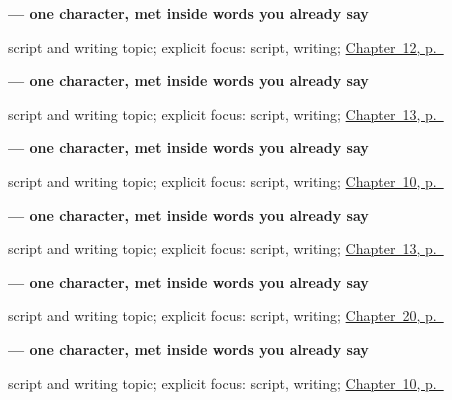 \noindent\begin{minipage}[t]{\linewidth}
\raggedright
\textbf{ — one character, met inside words you already say}\par
\footnotesize script and writing topic; explicit focus: script, writing; \hyperref[ch:ml-family]{Chapter~12, p.~\pageref*{ch:ml-family}}
\end{minipage}\par\smallskip

\noindent\begin{minipage}[t]{\linewidth}
\raggedright
\textbf{ — one character, met inside words you already say}\par
\footnotesize script and writing topic; explicit focus: script, writing; \hyperref[ch:ml-head-and-hand]{Chapter~13, p.~\pageref*{ch:ml-head-and-hand}}
\end{minipage}\par\smallskip

\noindent\begin{minipage}[t]{\linewidth}
\raggedright
\textbf{ — one character, met inside words you already say}\par
\footnotesize script and writing topic; explicit focus: script, writing; \hyperref[ch:ml-days-of-the-week]{Chapter~10, p.~\pageref*{ch:ml-days-of-the-week}}
\end{minipage}\par\smallskip

\noindent\begin{minipage}[t]{\linewidth}
\raggedright
\textbf{ — one character, met inside words you already say}\par
\footnotesize script and writing topic; explicit focus: script, writing; \hyperref[ch:ml-head-and-hand]{Chapter~13, p.~\pageref*{ch:ml-head-and-hand}}
\end{minipage}\par\smallskip

\noindent\begin{minipage}[t]{\linewidth}
\raggedright
\textbf{ — one character, met inside words you already say}\par
\footnotesize script and writing topic; explicit focus: script, writing; \hyperref[ch:ml-numbers-and-weather]{Chapter~20, p.~\pageref*{ch:ml-numbers-and-weather}}
\end{minipage}\par\smallskip

\noindent\begin{minipage}[t]{\linewidth}
\raggedright
\textbf{ — one character, met inside words you already say}\par
\footnotesize script and writing topic; explicit focus: script, writing; \hyperref[ch:ml-days-of-the-week]{Chapter~10, p.~\pageref*{ch:ml-days-of-the-week}}
\end{minipage}\par\smallskip

